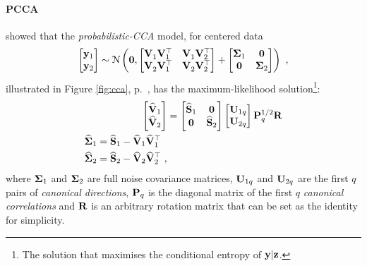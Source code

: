       \paragraph{PCCA} \citet{Bach:kica02} showed that the \textit{probabilistic-CCA} model, for centered data
      \begin{equation} \label{equ:chap4_marginalPCCA}
	\begin{bmatrix}  \mathbf{y}_1 \\ \mathbf{y}_2  \end{bmatrix}
	\sim \mathcal{N} \left(  \mathbf{0} ,  \begin{bmatrix}  \mathbf{V}_1^{~} \mathbf{V}_1^\top & \mathbf{V}_1^{~} \mathbf{V}_2^\top \\ \mathbf{V}_2^{~} \mathbf{V}_1^\top & \mathbf{V}_2^{~} \mathbf{V}_2^\top  \end{bmatrix}
	+ \begin{bmatrix}  \mathbf{\Sigma}_1 & \mathbf{0} \\ \mathbf{0} & \mathbf{\Sigma}_2  \end{bmatrix}
	 \right) ~,
      \end{equation}
      illustrated in Figure \ref{fig:cca}, p.~\pageref{fig:cca}, has the maximum-likelihood solution\footnote{The solution that maximises the conditional entropy of $\mathbf{y}|\mathbf{z}$.}:
      \begin{align} \label{equ:chap4_pcca_solution}
	\begin{bmatrix}  \widehat{\mathbf{V}}_{1} \\ \widehat{\mathbf{V}}_{2}  \end{bmatrix} &= \begin{bmatrix}  \widehat{\mathbf{S}}_1 &\mathbf{0} \\
	\mathbf{0} &\widehat{\mathbf{S}}_2  \end{bmatrix} \begin{bmatrix}  \mathbf{U}_{1q} \\ \mathbf{U}_{2q}  \end{bmatrix} \mathbf{P}^{1/2}_q\mathbf{R} \\
	\begin{split}
	  \widehat{\mathbf{\Sigma}}_1 &= \widehat{\mathbf{S}}_1 - \widehat{\mathbf{V}}_1 \widehat{\mathbf{V}}_1^\top \\
	  \widehat{\mathbf{\Sigma}}_2 &= \widehat{\mathbf{S}}_2 - \widehat{\mathbf{V}}_2 \widehat{\mathbf{V}}_2^\top ~,
	\end{split}
      \end{align}
      where $\mathbf{\Sigma}_1$ and $\mathbf{\Sigma}_2$ are full noise covariance matrices, $\mathbf{U}_{1q}$ and $\mathbf{U}_{2q}$ are the first $q$ pairs of \textit{canonical directions}, $\mathbf{P}_q$ is the diagonal matrix of the first $q$ \textit{canonical correlations} and $\mathbf{R}$ is an arbitrary rotation matrix that can be set as the identity for simplicity.

    
